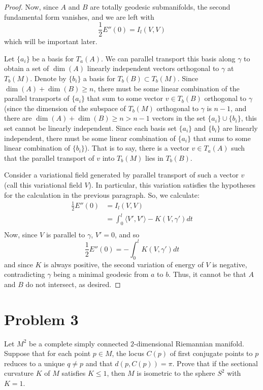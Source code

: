 \documentclass[fontsize=11pt]{scrartcl} %
\numberwithin{equation}{section} %
\numberwithin{figure}{section} %
\numberwithin{table}{section} %
\begin{document}
\begin{proof}
    Now, since $A$ and $B$ are totally geodesic submanifolds, the second
    fundamental form vanishes, and we are left with
    \[
        \frac{1}{2}E''(0) = I_l(V,V)
    \]
    which will be important later.

    Let $\{a_i\}$ be a basis for $T_a(A)$. We can parallel transport this basis
    along $\gamma$ to obtain a set of $\dim(A)$ linearly independent vectors
    orthogonal to $\gamma$ at $T_b(M)$. Denote by $\{b_i\}$ a basis for
    $T_b(B)\subset T_b(M)$. Since $\dim(A)+\dim(B)\geq n$, there
    must be some linear combination of the parallel transports of $\{a_i\}$ that
    sum to some vector $v\in T_b(B)$ orthogonal to $\gamma$ (since the dimension
        of the subspace of $T_b(M)$ orthogonal to $\gamma$ is $n-1$, and there
        are $\dim(A)+\dim(B)\geq n>n-1$ vectors in the set $\{a_i\}\cup\{b_i\}$,
        this set cannot be linearly independent. Since each basis set $\{a_i\}$
        and $\{b_i\}$ are linearly independent, there must be some linear
        combination of $\{a_i\}$ that sums to some linear combination of
    $\{b_i\}$). That is to say, there is a vector $v\in T_a(A)$ such that
    the parallel transport of $v$ into $T_b(M)$ lies in $T_b(B)$.

    Consider a variational field generated by parallel transport of such a
    vector $v$ (call this variational field $V$). In particular, this variation
    satisfies the hypotheses for the calculation in the previous paragraph.
    So, we calculate:
    \[
        \begin{aligned}
            \frac{1}{2}E''(0) &= I_l(V,V)\\
            &= \int_0^l\langle V',V'\rangle - K(V,\gamma')dt\\
        \end{aligned}
    \]
    Now, since $V$ is parallel to $\gamma$, $V'=0$, and so
    \[
        \frac{1}{2}E''(0) = -\int_0^lK(V,\gamma')dt
    \]
    and since $K$ is always positive, the second variation of energy of $V$ is
    negative, contradicting $\gamma$ being a minimal geodesic from $a$ to $b$.
    Thus, it cannot be that $A$ and $B$ do not intersect, as desired.
\end{proof}

\newpage

\section*{Problem 3}

Let $M^2$ be a complete simply connected $2$-dimensional Riemannian manifold.
Suppose that for each point $p\in M$, the locus $C(p)$ of first conjugate points
to $p$ reduces to a unique $q\neq p$ and that $d(p,C(p))=\pi$. Prove that if the
sectional curvature $K$ of $M$ satisfies $K\leq 1$, then $M$ is isometric to the
sphere $S^2$ with $K=1$.
\end{document}
